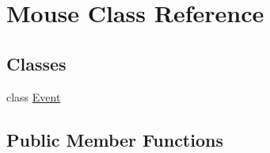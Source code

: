 \hypertarget{class_mouse}{}\section{Mouse Class Reference}
\label{class_mouse}
\subsection*{Classes}
\begin{DoxyCompactItemize}
\item 
class \hyperlink{class_mouse_1_1_event}{Event}
\end{DoxyCompactItemize}
\subsection*{Public Member Functions}
